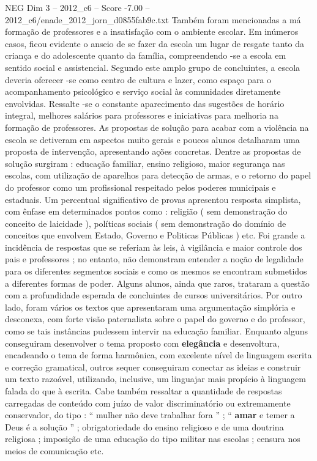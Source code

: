 \begin{textsample}{NEG Dim 3 – 2012\_c6 – Score -7.00 – 2012\_c6/enade\_2012\_jorn\_d0855fab9c.txt}
Também foram mencionadas a má formação de professores e a insatisfação com o ambiente escolar.
Em inúmeros casos, ficou evidente o anseio de se fazer da escola um lugar de resgate tanto da criança e do adolescente quanto da família, compreendendo -se a escola em sentido social e assistencial.
Segundo este amplo grupo de concluintes, a escola deveria oferecer -se como centro de cultura e lazer, como espaço para o acompanhamento psicológico e serviço social às comunidades diretamente envolvidas.
Ressalte -se o constante aparecimento das sugestões de horário integral, melhores salários para professores e iniciativas para melhoria na formação de professores.
As propostas de solução para acabar com a violência na escola se detiveram em aspectos muito gerais e poucos alunos detalharam uma proposta de intervenção, apresentando ações concretas.
Dentre as propostas de solução surgiram : educação familiar, ensino religioso, maior segurança nas escolas, com utilização de aparelhos para detecção de armas, e o retorno do papel do professor como um profissional respeitado pelos poderes municipais e estaduais.
Um percentual significativo de provas apresentou resposta simplista, com ênfase em determinados pontos como : religião ( sem demonstração do conceito de laicidade ), políticas sociais ( sem demonstração do domínio de conceitos que envolvem Estado, Governo e Politicas Públicas ) etc.
Foi grande a incidência de respostas que se referiam às leis, à vigilância e maior controle dos pais e professores ; no entanto, não demonstram entender a noção de legalidade para os diferentes segmentos sociais e como os mesmos se encontram submetidos a diferentes formas de poder.
Alguns alunos, ainda que raros, trataram a questão com a profundidade esperada de concluintes de cursos universitários.
Por outro lado, foram vários os textos que apresentaram uma argumentação simplória e desconexa, com forte visão paternalista sobre o papel do governo e do professor, como se tais instâncias pudessem intervir na educação familiar.
Enquanto alguns conseguiram desenvolver o tema proposto com \textbf{elegância} e desenvoltura, encadeando o tema de forma harmônica, com excelente nível de linguagem escrita e correção gramatical, outros sequer conseguiram conectar as ideias e construir um texto razoável, utilizando, inclusive, um linguajar mais propício à linguagem falada do que à escrita.
Cabe também ressaltar a quantidade de respostas carregadas de conteúdo com juízo de valor discriminatório ou extremamente conservador, do tipo : “ mulher não deve trabalhar fora ” ; “ \textbf{amar} e temer a Deus é a solução ” ; obrigatoriedade do ensino religioso e de uma doutrina religiosa ; imposição de uma educação do tipo militar nas escolas ; censura nos meios de comunicação etc.

\end{textsample}
